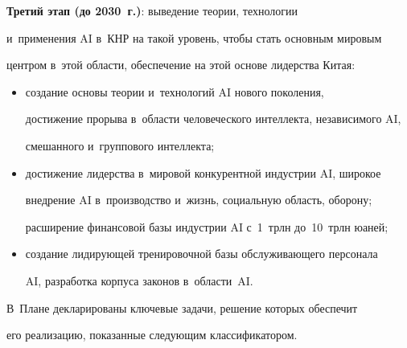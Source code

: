      


     \textbf{Третий этап (до 2030~г.)}: выведение тео\-рии, технологии 


и~применения AI в~КНР на такой уровень, чтобы стать основным мировым 


центром в~этой области, обеспечение на этой основе лидерства Китая:


     \begin{itemize}


\item создание основы теории и~технологий AI нового поколения, 


достижение прорыва в~области человеческого интеллекта, независимого AI, 


смешанного и~группового интеллекта;


\item достижение лидерства в~мировой конкурентной индустрии AI, широкое 


внед\-ре\-ние AI в~производство и~жизнь, социальную об\-ласть, оборону; 


расширение финансовой базы индустрии AI с~1~трлн до~10~трлн юаней;


\item создание лидирующей тренировочной базы об\-слу\-жи\-ва\-юще\-го персонала 


AI, разработка корпуса законов в~об\-ласти~AI.


\end{itemize}


     


     В~Плане декларированы ключевые задачи, решение которых обеспечит 


его реализацию, показанные следующим классификатором.


